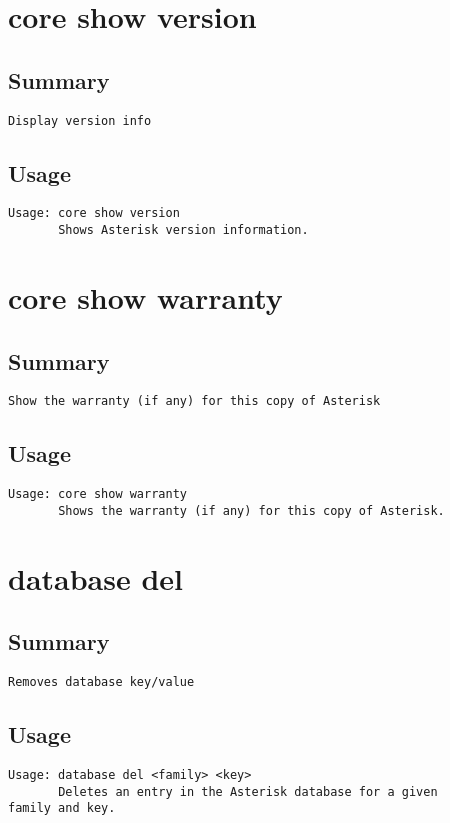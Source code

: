 \section{core show version}
\subsection{Summary}
\begin{verbatim}
Display version info
\end{verbatim}
\subsection{Usage}
\begin{verbatim}
Usage: core show version
       Shows Asterisk version information.

\end{verbatim}


\section{core show warranty}
\subsection{Summary}
\begin{verbatim}
Show the warranty (if any) for this copy of Asterisk
\end{verbatim}
\subsection{Usage}
\begin{verbatim}
Usage: core show warranty
       Shows the warranty (if any) for this copy of Asterisk.

\end{verbatim}


\section{database del}
\subsection{Summary}
\begin{verbatim}
Removes database key/value
\end{verbatim}
\subsection{Usage}
\begin{verbatim}
Usage: database del <family> <key>
       Deletes an entry in the Asterisk database for a given
family and key.

\end{verbatim}


